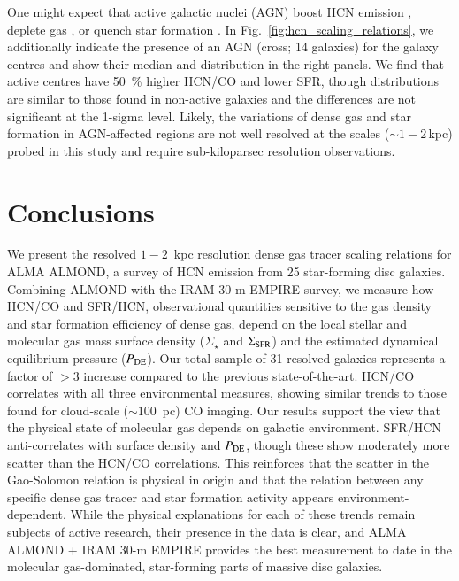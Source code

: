 \documentclass[letter, longauth]{aa} %
\begin{document}
One might expect that active galactic nuclei (AGN) boost HCN emission \citep[e.g.,][]{Goldsmith2018, Matsushita2015}, deplete gas \citep[e.g.][]{Ellison2021}, or quench star formation \citep[e.g.,][]{Nelson2019}.
In Fig.~\ref{fig:hcn_scaling_relations}, we additionally indicate the presence of an AGN (cross; 14 galaxies) for the galaxy centres and show their median and distribution in the right panels.
We find that active centres have \SI{50}{\percent} higher HCN/CO and lower SFR, though distributions are similar to those found in non-active galaxies and the differences are not significant at the 1-sigma level.
Likely, the variations of dense gas and star formation in AGN-affected regions are not well resolved at the scales ($\sim 1-2\,$kpc) probed in this study and require sub-kiloparsec resolution observations.


\section{Conclusions}
\label{sec:conclusions}

We present the resolved $1{-}2$~kpc resolution dense gas tracer scaling relations for ALMA ALMOND, a survey of HCN emission from 25 star-forming disc galaxies. 
Combining ALMOND with the IRAM 30-m EMPIRE survey, we measure how HCN/CO and SFR/HCN, observational quantities sensitive to the gas density and star formation efficiency of dense gas, depend on the local stellar and molecular gas mass surface density ($\Sigma_\star$ and $\Sigma_{\rm SFR}$) and the estimated dynamical equilibrium pressure ($P_{\rm DE}$). 
Our total sample of 31 resolved galaxies represents a factor of $>3$ increase compared to the previous state-of-the-art. 
HCN/CO correlates with all three environmental measures, showing similar trends to those found for cloud-scale ($\sim 100$~pc) CO imaging. 
Our results support the view that the physical state of molecular gas depends on galactic environment. SFR/HCN anti-correlates with surface density and $P_{\rm DE}$, though these show moderately more scatter than the HCN/CO correlations. This reinforces that the scatter in the Gao-Solomon relation is physical in origin and that the relation between any specific dense gas tracer and star formation activity appears environment-dependent. While the physical explanations for each of these trends remain subjects of active research, their presence in the data is clear, and ALMA ALMOND + IRAM 30-m EMPIRE provides the best measurement to date in the molecular gas-dominated, star-forming parts of massive disc galaxies.
\end{document}
